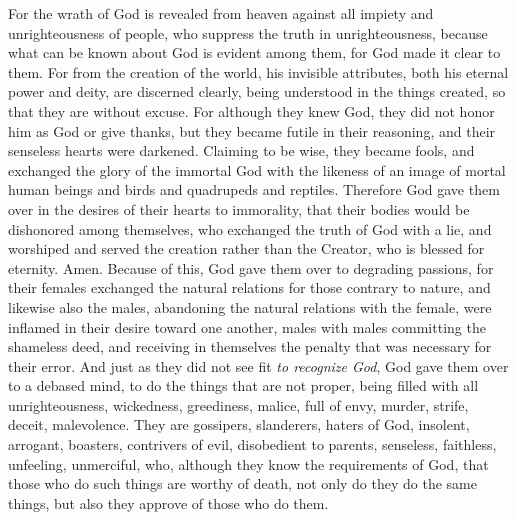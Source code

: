 \begin{biblechapter}
 For the wrath of God is revealed from heaven against all impiety and unrighteousness of people, who suppress the truth in unrighteousness,
\verse because what can be known about God is evident among them, for God made it clear to them.
\verse For from the creation of the world, his invisible attributes, both his eternal power and deity, are discerned clearly, being understood in the things created, so that they are without excuse.
\verse For although they knew God, they did not honor him as God or give thanks, but they became futile in their reasoning, and their senseless hearts were darkened.
\verse Claiming to be wise, they became fools,
\verse and exchanged the glory of the immortal God with the likeness of an image of mortal human beings and birds and quadrupeds and reptiles.
\verse Therefore God gave them over in the desires of their hearts to immorality, that their bodies would be dishonored among themselves,
\verse who exchanged the truth of God with a lie, and worshiped and served the creation rather than the Creator, who is blessed for eternity. Amen.
 Because of this, God gave them over to degrading passions, for their females exchanged the natural relations for those contrary to nature,
\verse and likewise also the males, abandoning the natural relations with the female, were inflamed in their desire toward one another, males with males committing the shameless deed, and receiving in themselves the penalty that was necessary for their error.
\verse And just as they did not see fit \textit{to recognize God}, God gave them over to a debased mind, to do the things that are not proper,
\verse being filled with all unrighteousness, wickedness, greediness, malice, full of envy, murder, strife, deceit, malevolence. They are gossipers,
\verse slanderers, haters of God, insolent, arrogant, boasters, contrivers of evil, disobedient to parents,
\verse senseless, faithless, unfeeling, unmerciful,
\verse who, although they know the requirements of God, that those who do such things are worthy of death, not only do they do the same things, but also they approve of those who do them.
\end{biblechapter}

